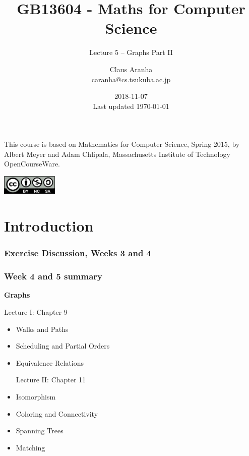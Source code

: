 \documentclass{beamer}
\title[GB13604]{GB13604 - Maths for Computer Science}
\subtitle[]{Lecture 5 -- Graphs Part II}
\author[Claus Aranha]{Claus Aranha\\{\footnotesize caranha@cs.tsukuba.ac.jp}}
\institute[COINS]{College of Information Science}
\date[2018-11-07]{2018-11-07\\{\tiny Last updated \today}}
\begin{document}
\begin{frame}
  \maketitle

  \begin{center}
    {\smaller This course is based on Mathematics for Computer Science, Spring
    2015, by Albert Meyer and Adam Chlipala, Massachusetts Institute
    of Technology OpenCourseWare.}
    
    \includegraphics[width=0.2\textwidth]{../img/by-nc-sa}
  \end{center}
\end{frame}

\section{Introduction}

\begin{frame}
  \frametitle{Exercise Discussion, Weeks 3 and 4}

\end{frame}

\begin{frame}
  \frametitle{Week 4 and 5 summary}

  {\larger
    {\bf Graphs}

    \bigskip

    \begin{center}
      Lecture I: Chapter 9
    \end{center}
    \begin{itemize}
    \item Walks and Paths
    \item Scheduling and Partial Orders
    \item Equivalence Relations

      \bigskip

      \begin{center}
        Lecture II: Chapter 11
      \end{center}
    \item Isomorphism
    \item Coloring and Connectivity
    \item Spanning Trees
    \item Matching
    \end{itemize}
  }
\end{frame}
\end{document}
